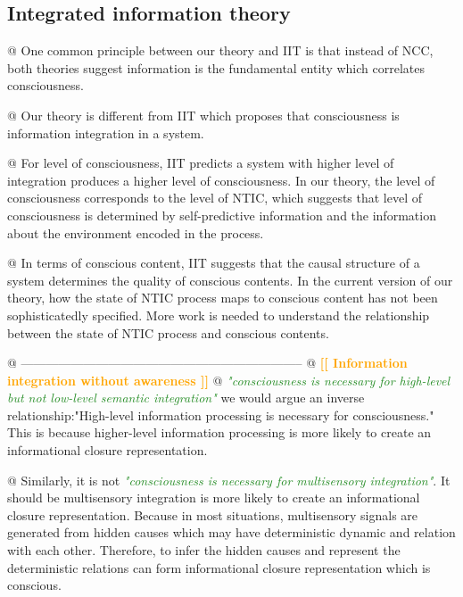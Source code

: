 \documentclass[utf8]{article}
\newenvironment{ants}
			{
			 \begin{easylist}[itemize]
		 	}
			{
			\end{easylist}
			} %
\newcommand{\rewrite}[1]{\textcolor{ForestGreen}{\textit{"#1"}}\newline}
\newcommand{\toWrite}[1]{\noindent
			\textcolor{Orange}{\textbf{[[ #1 ]]}}}
\newcommand{\needref}[1]{%
			\ifthenelse{\equal{#1}{}}{%
				\todo[color=White, linecolor=Orange, bordercolor=Orange]{\textcolor{Orange}{Ref}}}{%
				\todo[color=White, linecolor=Orange, bordercolor=Orange]{\textcolor{Orange}{Ref: #1}}%
			}%
		}
\newcommand{\rlstart}[1]{  %
        \setlength\changebarwidth{#1pt*2}  %
        \hspace*{-40pt}
        \cbstart{\textcolor{red}{\newline\textbf{iteration #1}}\newline}}
\begin{document}
\rlstart{1}
		\subsection{Integrated information theory}
			\begin{ants}
			
			@ One common principle between our theory and IIT is that instead of NCC, both theories suggest information is the fundamental entity which correlates consciousness. \needref{cite David Chalmers}
			
			@ Our theory is different from IIT which proposes that consciousness is information integration in a system.
			
			@ For level of consciousness, IIT predicts a system with higher level of integration produces a higher level of consciousness. In our theory, the level of consciousness corresponds to the level of NTIC, which suggests that level of consciousness is determined by self-predictive information and the information about the environment encoded in the process.
			
			@ In terms of conscious content, IIT suggests that the causal structure of a system determines the quality of conscious contents. In the current version of our theory, how the state of NTIC process maps to conscious content has not been sophisticatedly specified. More work is needed to understand the relationship between the state of NTIC process and conscious contents.
		
		    @ --------------------------------------------------------------------
			@ \toWrite{Information integration without awareness}\cite{Mudrik_Faivre_Koch}
			@ \rewrite{consciousness is necessary for high-level but not low-level semantic integration}\cite{Mudrik_Faivre_Koch} we would argue an inverse relationship:"High-level information processing is necessary for consciousness." This is because higher-level information processing is more likely to create an informational closure representation.

			@ Similarly, it is not \rewrite{consciousness is necessary for multisensory integration}. It should be multisensory integration is more likely to create an informational closure representation. Because in most situations, multisensory signals are generated from hidden causes which may have deterministic dynamic and relation with each other. Therefore, to infer the hidden causes and represent the deterministic relations can form informational closure representation which is conscious.

			\end{ants}
\end{document}

